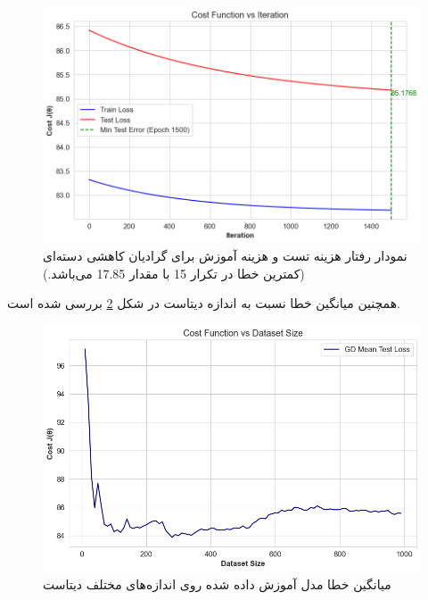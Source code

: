 \documentclass{article}
\begin{document}
	\begin{figure}[H]
		\centering
		\includegraphics[scale=0.5]{figs/gd_costvsiter_2}
		\caption{نمودار رفتار هزینه تست و هزینه آموزش برای گرادیان کاهشی دسته‌ای (کمترین خطا در تکرار 15 با مقدار 17.85 می‌باشد.)}
		\label{fig: gd_costfull}
	\end{figure}
	همچنین میانگین خطا نسبت به اندازه دیتاست در شکل 
	\ref{fig: gd datasize}
	بررسی شده است.
	\begin{figure}[H]
		\centering
		\includegraphics[scale=0.5]{figs/gd_mean_test_error}
		\caption{میانگین خطا مدل آموزش داده شده روی اندازه‌های مختلف دیتاست}
		\label{fig: gd datasize}
	\end{figure}
\end{document}
